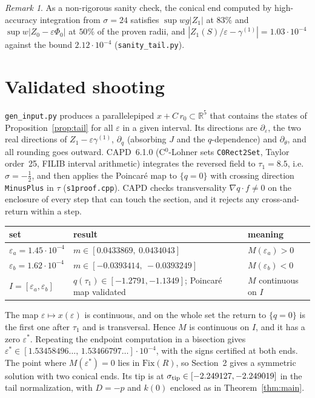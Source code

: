 \documentclass[11pt]{amsart}
\theoremstyle{remark}
\newtheorem{remark}[theorem]{Remark}
\newcommand{\R}{\mathbb{R}}
\newcommand{\eps}{\varepsilon}
\begin{document}
\begin{remark}
As a non-rigorous sanity check, the conical end computed by high-accuracy integration from $\sigma=24$ satisfies $\sup wg|Z_1|$ at $83\%$ and $\sup w|Z_0-\eps\Phi_0|$ at $50\%$ of the proven radii, and $|Z_1(S)/\eps-\gamma^{(1)}|=1.03\cdot10^{-4}$ against the bound $2.12\cdot10^{-4}$ (\texttt{sanity\_tail.py}).
\end{remark}

\section{Validated shooting}\label{sec:shoot}
\texttt{gen\_input.py} produces a parallelepiped $x+C\,r_0\subset\R^5$ that contains the states of Proposition~\ref{prop:tail} for all $\eps$ in a given interval. Its directions are $\partial_\eps$, the two real directions of $Z_1-\eps\gamma^{(1)}$, $\partial_q$ (absorbing $J$ and the $q$-dependence) and $\partial_\theta$, and all rounding goes outward. CAPD~6.1.0 (C$^0$-Lohner sets \texttt{C0Rect2Set}, Taylor order~25, FILIB interval arithmetic) integrates the reversed field to $\tau_1=8.5$, i.e.\ $\sigma=-\frac12$, and then applies the Poincar\'e map to $\{q=0\}$ with crossing direction \texttt{MinusPlus} in $\tau$ (\texttt{s1proof.cpp}). CAPD checks transversality $\nabla q\cdot f\ne0$ on the enclosure of every step that can touch the section, and it rejects any cross-and-return within a step.

\begin{center}\small
\begin{tabular}{lll}
\hline
set & result & meaning\\\hline
$\eps_a=1.45\cdot10^{-4}$ & $m\in[0.0433869,\ 0.0434043]$ & $M(\eps_a)>0$\\
$\eps_b=1.62\cdot10^{-4}$ & $m\in[-0.0393414,\ -0.0393249]$ & $M(\eps_b)<0$\\
$I=[\eps_a,\eps_b]$ & $q(\tau_1)\in[-1.2791,-1.1349]$; Poincar\'e map validated & $M$ continuous on $I$\\\hline
\end{tabular}
\end{center}

The map $\eps\mapsto x(\eps)$ is continuous, and on the whole set the return to $\{q=0\}$ is the first one after $\tau_1$ and is transversal. Hence $M$ is continuous on $I$, and it has a zero $\eps^*$. Repeating the endpoint computation in a bisection gives $\eps^*\in[1.53458496\ldots,\,1.53466797\ldots]\cdot10^{-4}$, with the signs certified at both ends. The point where $M(\eps^*)=0$ lies in $\mathrm{Fix}(R)$, so Section~2 gives a symmetric solution with two conical ends. Its tip is at $\sigma_{\rm tip}\in[-2.249127,-2.249019]$ in the tail normalization, with $D=-p$ and $k(0)$ enclosed as in Theorem~\ref{thm:main}.
\end{document}
